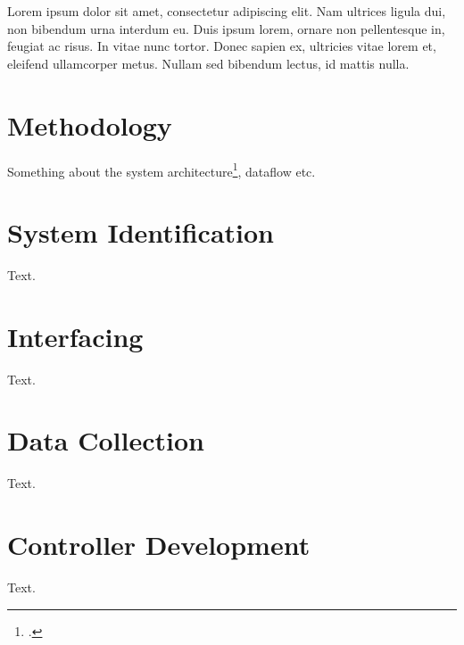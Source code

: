Lorem ipsum dolor sit amet, consectetur adipiscing elit. Nam ultrices ligula dui, non bibendum urna interdum eu. Duis ipsum lorem, ornare non pellentesque in, feugiat ac risus. In vitae nunc tortor. Donec sapien ex, ultricies vitae lorem et, eleifend ullamcorper metus. Nullam sed bibendum lectus, id mattis nulla.

\section{Methodology}
Something about the system architecture\footcite[]{book}, dataflow etc.

\section{System Identification}
Text.

\section{Interfacing}
Text.

\newpage
\section{Data Collection}
Text.

\section{Controller Development}
Text.

